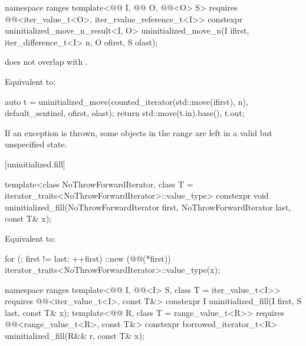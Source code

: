 %
\begin{itemdecl}
namespace ranges {
  template<@@ I, @@ O, @@<O> S>
    requires @@<iter_value_t<O>, iter_rvalue_reference_t<I>>
    constexpr uninitialized_move_n_result<I, O>
      uninitialized_move_n(I ifirst, iter_difference_t<I> n, O ofirst, S olast);
}
\end{itemdecl}

\begin{itemdescr}
\pnum
\expects
{} does not overlap with .

\pnum
\effects
Equivalent to:
\begin{codeblock}
auto t = uninitialized_move(counted_iterator(std::move(ifirst), n),
                            default_sentinel, ofirst, olast);
return {std::move(t.in).base(), t.out};
\end{codeblock}

\pnum
\begin{note}
If an exception is thrown, some objects in the range
are left in a valid but unspecified state.
\end{note}
\end{itemdescr}

[uninitialized.fill]{}

%
\begin{itemdecl}
template<class NoThrowForwardIterator,
         class T = iterator_traits<NoThrowForwardIterator>::value_type>
  constexpr void uninitialized_fill(NoThrowForwardIterator first,
                                    NoThrowForwardIterator last, const T& x);
\end{itemdecl}

\begin{itemdescr}
\pnum
\effects
Equivalent to:
\begin{codeblock}
for (; first != last; ++first)
  ::new (@@(*first)) iterator_traits<NoThrowForwardIterator>::value_type(x);
\end{codeblock}
\end{itemdescr}

%
\begin{itemdecl}
namespace ranges {
  template<@@ I, @@<I> S, class T = iter_value_t<I>>
    requires @@<iter_value_t<I>, const T&>
    constexpr I uninitialized_fill(I first, S last, const T& x);
  template<@@ R, class T = range_value_t<R>>
    requires @@<range_value_t<R>, const T&>
    constexpr borrowed_iterator_t<R> uninitialized_fill(R&& r, const T& x);
}
\end{itemdecl}

